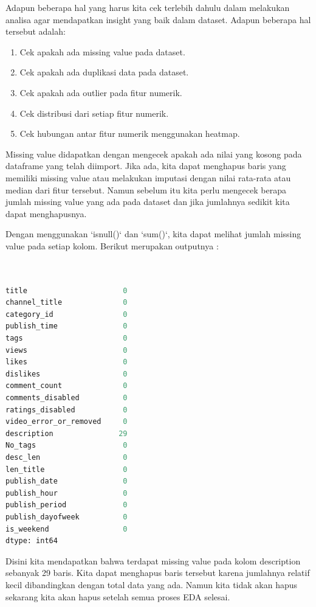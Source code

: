 Adapun beberapa hal yang harus kita cek terlebih dahulu dalam melakukan analisa agar mendapatkan insight yang baik dalam dataset. Adapun beberapa hal tersebut adalah:

\begin{enumerate}
    \item Cek apakah ada missing value pada dataset.
    \item Cek apakah ada duplikasi data pada dataset.
    \item Cek apakah ada outlier pada fitur numerik.
    \item Cek distribusi dari setiap fitur numerik.
    \item Cek hubungan antar fitur numerik menggunakan heatmap.
\end{enumerate}

Missing value didapatkan dengan mengecek apakah ada nilai yang kosong pada dataframe yang telah diimport. Jika ada, kita dapat menghapus baris yang memiliki missing value atau melakukan imputasi dengan nilai rata-rata atau median dari fitur tersebut. Namun sebelum itu kita perlu mengecek berapa jumlah missing value yang ada pada dataset dan jika jumlahnya sedikit kita dapat menghapusnya.

Dengan menggunakan `isnull()` dan `sum()`, kita dapat melihat jumlah missing value pada setiap kolom. Berikut merupakan outputnya :

\begin{lstlisting}[language=Python, caption=Informasi DataFrame]


title                      0
channel_title              0
category_id                0
publish_time               0
tags                       0
views                      0
likes                      0
dislikes                   0
comment_count              0
comments_disabled          0
ratings_disabled           0
video_error_or_removed     0
description               29
No_tags                    0
desc_len                   0
len_title                  0
publish_date               0
publish_hour               0
publish_period             0
publish_dayofweek          0
is_weekend                 0
dtype: int64

\end{lstlisting}

Disini kita mendapatkan bahwa terdapat missing value pada kolom description sebanyak 29 baris. Kita dapat menghapus baris tersebut karena jumlahnya relatif kecil dibandingkan dengan total data yang ada. Namun kita tidak akan hapus sekarang kita akan hapus setelah semua proses EDA selesai.

